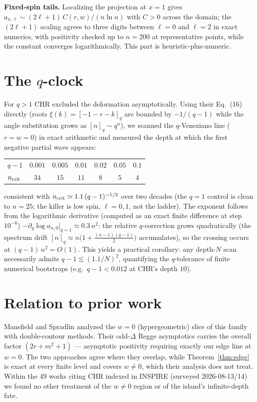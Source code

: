 \documentclass[11pt]{article}
\begin{document}
\textbf{Fixed-spin tails.} Localizing the projection at $x=1$ gives
$a_{n,\ell}\sim (2\ell+1)\,C(r,w)/(n\ln n)$ with $C>0$ across the domain; the
$(2\ell+1)$ scaling agrees to three digits between $\ell=0$ and $\ell=2$ in
exact numerics, with positivity checked up to $n=200$ at representative points,
while the constant converges logarithmically. This part is heuristic-plus-numeric.

\section{The $q$-clock}

For $q>1$ CHR excluded the deformation asymptotically. Using their Eq.~(16)
directly (roots $\xi(k)=[-1-r-k]_q$ are bounded by $-1/(q-1)$ while the angle
substitution grows as $[n]_q\sim q^n$), we scanned the $q$-Veneziano line
($r=w=0$) in exact arithmetic and measured the depth at which the first
negative partial wave appears:
\begin{center}
\begin{tabular}{lcccccc}
\toprule
$q-1$ & $0.001$ & $0.005$ & $0.01$ & $0.02$ & $0.05$ & $0.1$\\
$n_{\rm crit}$ & $34$ & $15$ & $11$ & $8$ & $5$ & $4$\\
\bottomrule
\end{tabular}
\end{center}
consistent with $n_{\rm crit}\simeq 1.1\,(q-1)^{-1/2}$ over two decades (the
$q=1$ control is clean to $n=25$; the killer is low spin, $\ell=0,1$, not the
ladder). The exponent follows from the logarithmic derivative (computed as an exact
finite difference at step $10^{-6}$)
$-\partial_q \log a_{n,0}\big|_{q=1}\approx 0.3\,n^2$: the relative
$q$-correction grows quadratically (the spectrum drift $[n]_q\approx
n\bigl(1+\tfrac{(n-1)(q-1)}{2}\bigr)$ accumulates), so the crossing occurs at
$(q-1)\,n^2=O(1)$. This yields a practical corollary: any depth-$N$ scan
necessarily admits $q-1\lesssim (1.1/N)^2$, quantifying the $q$-tolerance of
finite numerical bootstraps (e.g.\ $q-1<0.012$ at CHR's depth $10$).

\section{Relation to prior work}

Mansfield and Spradlin \cite{MS2024} analyzed the $w=0$ (hypergeometric)
slice of this family with double-contour methods. Their odd-$\Delta$ Regge
asymptotics carries the overall factor $(2r+m^2+1)$ --- asymptotic positivity
requiring exactly our edge line at $w=0$. The two approaches agree where they
overlap, while Theorem~\ref{thm:edge} is exact at every finite level and
covers $w\neq 0$, which their analysis does not treat. Within the $49$ works citing CHR indexed in
INSPIRE (surveyed 2026-08-13/14) we found no other treatment of the
$w\neq 0$ region or of the island's infinite-depth fate.
\end{document}
